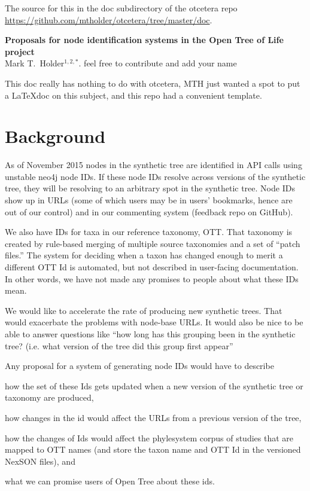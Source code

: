 \documentclass[11pt]{article}
\begin{document}
The source for this in the doc subdirectory of the otcetera
    repo \url{https://github.com/mtholder/otcetera/tree/master/doc}.
\begin{center}
    {\bf Proposals for node identification systems in the Open Tree of Life project} \\
{Mark T.~Holder$^{1,2,\ast}$. feel free to contribute and add your name}
\end{center}
This doc really has nothing to do with otcetera, MTH just wanted a spot to
put a \LaTeX doc on this subject, and this repo had a convenient template.

\tableofcontents
\section{Background}
As of November 2015 nodes in the synthetic tree are identified in API calls
    using unstable neo4j node IDs.
If these node IDs resolve across versions of the synthetic tree, they will be
    resolving to an arbitrary spot in the synthetic tree.
Node IDs show up in URLs (some of which users may be in users' bookmarks, hence
    are out of our control) and in our commenting system (feedback repo on GitHub).

We also have IDs for taxa in our reference taxonomy, OTT.
That taxonomy is created by rule-based merging of multiple source taxonomies and
    a set of ``patch files.''
The system for deciding when a taxon has changed enough to merit a different OTT Id
    is automated, but not described in user-facing documentation.
In other words, we have not made any promises to people about what these IDs mean.

We would like to accelerate the rate of producing new synthetic trees.
That would exacerbate the problems with node-base URLs.
It would also be nice to be able to answer questions like ``how long has this grouping
been in the synthetic tree? (i.e. what version of the tree did this group first appear''

Any proposal for a system of generating node IDs would have to describe
\begin{compactenum}
  \item how the
    set of these Ids gets updated when a new version of the synthetic tree or taxonomy are produced,
  \item how changes in the id would affect the URLs from a previous version of the tree, 
  \item how the changes of Ids would affect the phylesystem corpus of studies that 
  are mapped to OTT names (and store the taxon name and OTT Id in the versioned NexSON
  files), and
  \item what we can promise users of Open Tree about these ids.
\end{compactenum}

\end{document}
